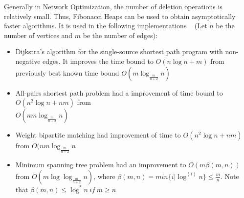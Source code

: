 Generally in Network Optimization, the number of deletion operations is relatively small. Thus, Fibonacci Heaps can be used to obtain asymptotically faster algorithms. It is used in the following implementations ~\cite{fredman1987fibonacci} (Let $n$ be the number of vertices and $m$ be the number of edges):
\begin{itemize}
	\item Dijkstra's algorithm for the single-source shortest path program with non-negative edges. It improves the time bound to $O(n \log{n} + m)$  from previously best known time bound $O(m\log_{\frac{m}{n+2}}n)$
	\item All-pairs shortest path problem had a improvement of time bound to $O(n^2\log{n} + nm)$ from \\ $O(nm\log_{\frac{m}{n+2}}n)$
	\item Weight bipartite matching had improvement of time to $O(n^2\log{n} + nm)$ from $O(nm\log_{\frac{m}{n+2}}n$
	\item Minimum spanning tree problem had an improvement to $O(m\beta(m,n))$ from $O(m\log{\log_{\frac{m}{n+2}}n})$, where $\beta(m,n) = min\{i|\log^{(i)}n\} \leq \frac{m}{n}$. Note that $\beta(m,n) \leq \log^{*}n \ if \ m \geq n $
\end{itemize}